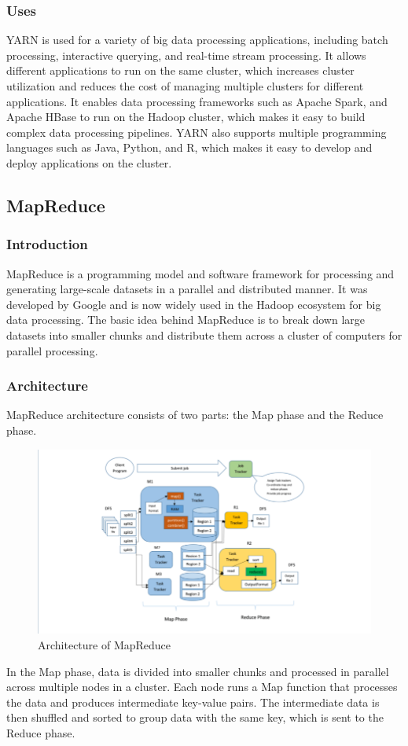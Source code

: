 \documentclass[12pt]{article}
\begin{document}
\subsubsection{Uses}
YARN is used for a variety of big data processing applications, including batch processing, interactive querying, and real-time stream processing. It allows different applications to run on the same cluster, which increases cluster utilization and reduces the cost of managing multiple clusters for different applications. It enables data processing frameworks such as Apache Spark, and Apache HBase to run on the Hadoop cluster, which makes it easy to build complex data processing pipelines. YARN also supports multiple
programming languages such as Java, Python, and R, which makes it easy to develop and deploy applications on the cluster.

\subsection{MapReduce}
\subsubsection{Introduction}
MapReduce is a programming model and software framework for processing and generating large-scale datasets in a parallel and distributed manner. It was
developed by Google and is now widely used in the Hadoop ecosystem for big data processing. The basic idea behind MapReduce is to break down large datasets into smaller chunks and distribute them across a cluster of computers for parallel
processing.
\subsubsection{Architecture}
MapReduce architecture consists of two parts: the Map phase and the Reduce phase. 
\begin{figure}[h!]
    \centering
    \includegraphics[scale =  0.4]{images/MapReduce.png}
    \caption{Architecture of MapReduce}
\end{figure}
In the Map phase, data is divided into smaller chunks and processed in parallel across multiple nodes in a cluster. Each node runs a Map function that processes the data and produces intermediate key-value pairs. The intermediate data is then shuffled and sorted to group data with the same key, which is sent to the Reduce phase.
\end{document}

